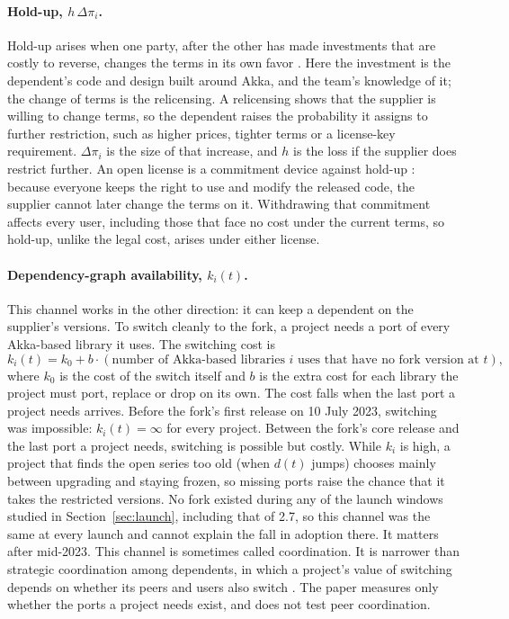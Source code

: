 \documentclass[11pt]{article}
\begin{document}
\paragraph{Hold-up, $h\,\Delta\pi_i$.} Hold-up arises when one party, after the other has made investments that are costly to reverse, changes the terms in its own favor \citep{klein1978,williamson1985}. Here the investment is the dependent's code and design built around Akka, and the team's knowledge of it; the change of terms is the relicensing. A relicensing shows that the supplier is willing to change terms, so the dependent raises the probability it assigns to further restriction, such as higher prices, tighter terms or a license-key requirement. $\Delta\pi_i$ is the size of that increase, and $h$ is the loss if the supplier does restrict further. An open license is a commitment device against hold-up \citep{lerner2002}: because everyone keeps the right to use and modify the released code, the supplier cannot later change the terms on it. Withdrawing that commitment affects every user, including those that face no cost under the current terms, so hold-up, unlike the legal cost, arises under either license.

\paragraph{Dependency-graph availability, $k_i(t)$.} This channel works in the other direction: it can keep a dependent on the supplier's versions. To switch cleanly to the fork, a project needs a port of every Akka-based library it uses. The switching cost is
\[
k_i(t)=k_0+b\cdot(\text{number of Akka-based libraries $i$ uses that have no fork version at $t$}),
\]
where $k_0$ is the cost of the switch itself and $b$ is the extra cost for each library the project must port, replace or drop on its own. The cost falls when the last port a project needs arrives. Before the fork's first release on 10 July 2023, switching was impossible: $k_i(t)=\infty$ for every project. Between the fork's core release and the last port a project needs, switching is possible but costly. While $k_i$ is high, a project that finds the open series too old (when $d(t)$ jumps) chooses mainly between upgrading and staying frozen, so missing ports raise the chance that it takes the restricted versions. No fork existed during any of the launch windows studied in Section~\ref{sec:launch}, including that of 2.7, so this channel was the same at every launch and cannot explain the fall in adoption there. It matters after mid-2023. This channel is sometimes called coordination. It is narrower than strategic coordination among dependents, in which a project's value of switching depends on whether its peers and users also switch \citep{farrell1985,farrell2007}. The paper measures only whether the ports a project needs exist, and does not test peer coordination.
\end{document}
